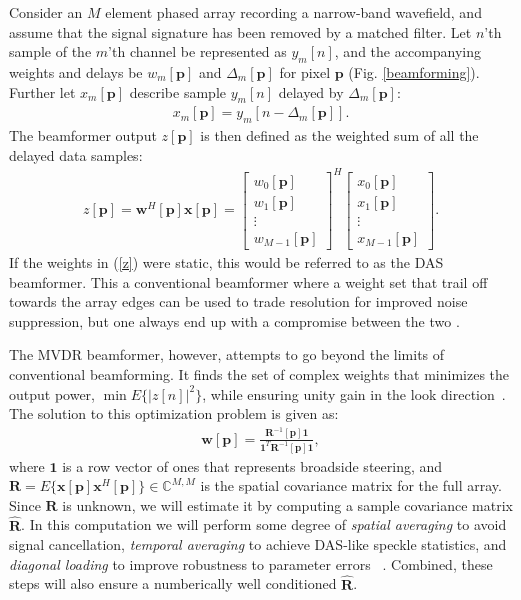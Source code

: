\documentclass[12pt,journal,captionsoff,onecolumn]{IEEEtran}
\newcommand\bmat[1]{\begin{bmatrix}#1\end{bmatrix}}
\newcommand\T{^{\scriptscriptstyle T}}
\renewcommand\H{^{\scriptscriptstyle H}}
\renewcommand\vec[1]{\boldsymbol{#1}}
\newcommand\mat[1]{\boldsymbol{#1}}
\newcommand\1{\vec 1}
\newcommand*\p{\vec p}
\newcommand*\w{\vec w}
\newcommand*\x{\vec x}
\newcommand*\R{\mat R}
\newcommand*\Ri{\R^{-1}}
\newcommand*\eR{\mat{\hat R}}
\begin{document}
Consider an $M$ element phased array recording a narrow-band wavefield, and assume that the signal signature has been removed by a matched filter. Let $n$'th sample of the $m$'th channel be represented as $y_m[n]$, and the accompanying weights and delays be  $w_m[\p]$ and $\Delta_m[\p]$ for pixel $\p$ (Fig. \ref{beamforming}). Further let $x_m[\p]$ describe sample $y_m[n]$ delayed by $\Delta_m[\p]$:
\begin{align}
x_m[\p] = y_m[n-\Delta_m[\p]].
\end{align}
The beamformer output $z[\p]$ is then defined as the weighted sum of all the delayed data samples:
\begin{align}
z[\p] = \w\H[\p]\x[\p] = \bmat{w_0[\p]\\w_1[\p]\\\vdots\\w_{M-1}[\p]}^H \bmat{x_0[\p]\\x_1[\p]\\\vdots\\x_{M-1}[\p]}.\label{z}
\end{align}
If the weights in (\ref{z}) were static, this would be referred to as the \gls{DAS} beamformer. This a conventional beamformer where a weight set that trail off towards the array edges can be used to trade resolution for improved noise suppression, but one always end up with a compromise between the two \cite{Harris1978}.

The \gls{MVDR} beamformer, however, attempts to go beyond the limits of conventional beamforming. It finds the set of complex weights that minimizes the output power, $\min E\{|z[n]|^2\}$, while ensuring unity gain in the look direction~\cite{Capon1969}. The solution to this optimization problem is given as:
\begin{gather}
\vec w[\p] = \frac{\Ri[\p]\1}{\1\T\Ri[\p]\1},\label{weights}
\end{gather}
where $\1$ is a row vector of ones that represents broadside steering, and $\R=E\{\x[\p]\x\H[\p]\} \in\mathbb{C}^{M,M}$ is the spatial covariance matrix for the full array. Since $\R$ is unknown, we will estimate it by computing a sample covariance matrix $\eR$. In this computation we will perform some degree of \emph{spatial averaging} to avoid signal cancellation, \emph{temporal averaging} to achieve \gls{DAS}-like speckle statistics, and \emph{diagonal loading} to improve robustness to parameter errors ~\cite{Synnevag2009a}. Combined, these steps will also ensure a numberically well conditioned $\eR$.
\end{document}
